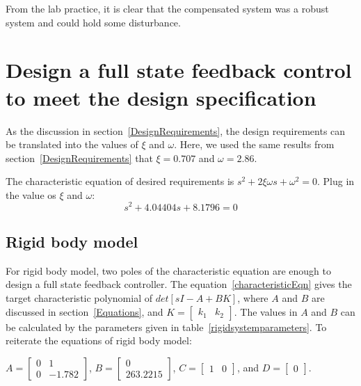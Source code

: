 \documentclass[a4paper, 12pt]{article}
\begin{document}
From the lab practice, it is clear that the compensated system was a robust system and could hold some disturbance. 



\section{Design a full state feedback control to meet the design specification}
\hspace{2.5ex} As the discussion in section~\ref{DesignRequirements}, the design requirements can be translated into the values of $\xi$ and $\omega$. Here, we used the same results from section~\ref{DesignRequirements} that $\xi = 0.707$ and $\omega = 2.86$.

The characteristic equation of desired requirements is $s^2 + 2\xi \omega s + \omega^2 =0 $. Plug in the value os $\xi$ and $\omega$: 
\begin{equation}\label{characteristicEqn}
s^2 + 4.04404s + 8.1796 =0 
\end{equation}

\subsection{Rigid body model}
For rigid body model, two poles of the characteristic equation are enough to design a full state feedback controller. The equation~\ref{characteristicEqn} gives the target characteristic polynomial of $det[sI - A+BK]$, where $A$ and $B$ are discussed in section~\ref{Equations}, and $K = \begin{bmatrix} k_1 & k_2 \end{bmatrix}$. The values in $A$ and $B$ can be calculated by the parameters given in table~\ref{rigidsystemparameters}. To reiterate the equations of rigid body model: 

$A=
\begin{bmatrix}
0	&	1	\\
0	&	-1.782
\end{bmatrix}
$, 
$B=
\begin{bmatrix}
0\\
263.2215
\end{bmatrix} 
$, 
$C = 
\begin{bmatrix}
1 &	0
\end{bmatrix}
$,
 and $D = \begin{bmatrix} 0 \end{bmatrix}$.
 
\end{document}
